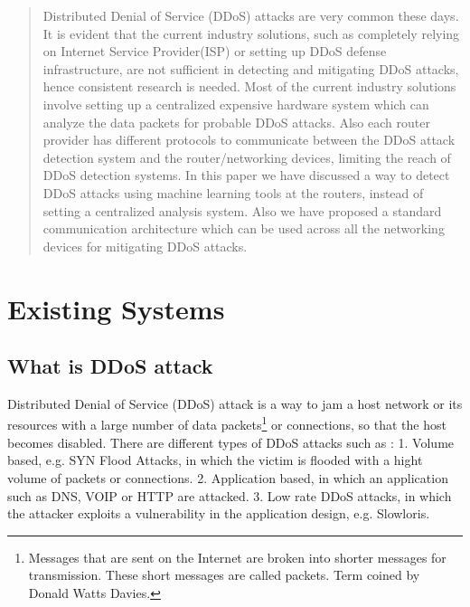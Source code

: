 \documentclass[12pt,oneside,a4paper]{article}
\begin{document}

\doublespacing
\renewcommand{\thepage}{\roman{page}}%
\setcounter{page}{2}%
\tableofcontents
\newpage
\pagestyle{myheadings}
\renewcommand{\thepage}{\arabic{page}}%

\begin{abstract}
Distributed Denial of Service (DDoS) attacks are very common these days\cite{ddos-attack-news}. It is evident that the current industry solutions, such as completely relying on Internet Service Provider(ISP) or setting up DDoS defense infrastructure, are not sufficient in detecting and mitigating DDoS attacks, hence consistent research is needed. Most of the current industry solutions involve setting up a centralized expensive hardware system which can analyze the data packets \cite{network-data-packet} for probable DDoS attacks. Also each router provider has different protocols to communicate between the DDoS attack detection system and the router/networking devices, limiting the reach of DDoS detection systems. In this paper we have discussed a way to detect DDoS attacks using machine learning tools at the routers, instead of setting a centralized analysis system. Also we have proposed a standard communication architecture which can be used across all the networking devices for mitigating DDoS attacks.
\end{abstract}

\section{Existing Systems}

\subsection{What is DDoS attack}
Distributed Denial of Service (DDoS) attack is a way to jam a host network or its resources with a large number of data packets\footnote{Messages that are sent on the Internet are broken into shorter messages for transmission. These short messages are called packets. Term coined by Donald Watts Davies.} or connections, so that the host becomes disabled. There are different types of DDoS attacks such as :
1. Volume based, e.g. SYN Flood Attacks, in which the victim is flooded with a hight volume of packets or connections.
2. Application based, in which an application such as DNS, VOIP or HTTP are attacked.
3. Low rate DDoS attacks, in which the attacker exploits a vulnerability in the application design, e.g. Slowloris.
\cite{DDoS-attacks}
\end{document}
